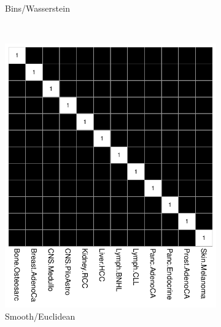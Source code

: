 \begin{figure}[ht!]
\begin{subfigure}{.55\textwidth}
    \caption{Bins/Wasserstein}
    \label{fig:bootstrap_bins_wasserstein}
    \end{subfigure} \\
    \vspace{0.5cm}
    
    \begin{subfigure}{.45\textwidth}
    \includegraphics[scale=0.65]{graphics/bootstrap_smooth_euclidean.pdf}
    \caption{Smooth/Euclidean}
    \label{fig:bootstrap_smooth_euclidean}
    \end{subfigure}
    ~
    \begin{subfigure}{.55\textwidth}

\end{subfigure}
\end{figure}
